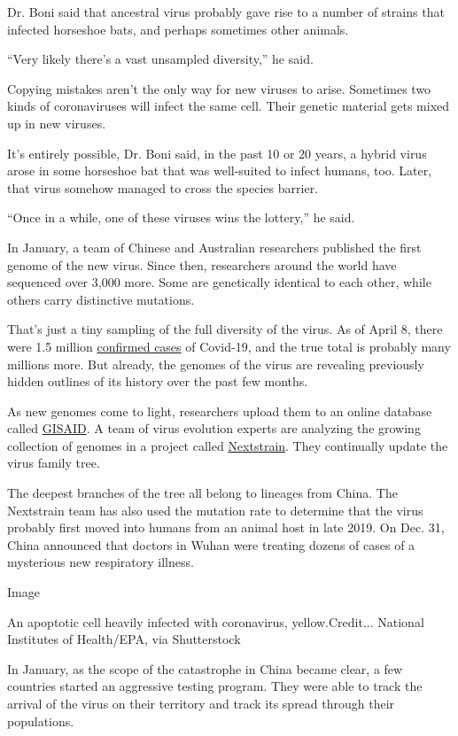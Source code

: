 Dr. Boni said that ancestral virus probably gave rise to a number of
strains that infected horseshoe bats, and perhaps sometimes other
animals.

``Very likely there's a vast unsampled diversity,'' he said.

Copying mistakes aren't the only way for new viruses to arise. Sometimes
two kinds of coronaviruses will infect the same cell. Their genetic
material gets mixed up in new viruses.

It's entirely possible, Dr. Boni said, in the past 10 or 20 years, a
hybrid virus arose in some horseshoe bat that was well-suited to infect
humans, too. Later, that virus somehow managed to cross the species
barrier.

``Once in a while, one of these viruses wins the lottery,'' he said.

In January, a team of Chinese and Australian researchers published the
first genome of the new virus. Since then, researchers around the world
have sequenced over 3,000 more. Some are genetically identical to each
other, while others carry distinctive mutations.

That's just a tiny sampling of the full diversity of the virus. As of
April 8, there were 1.5 million
\href{https://gisanddata.maps.arcgis.com/apps/opsdashboard/index.html\#/bda7594740fd40299423467b48e9ecf6}{confirmed
cases} of Covid-19, and the true total is probably many millions more.
But already, the genomes of the virus are revealing previously hidden
outlines of its history over the past few months.

As new genomes come to light, researchers upload them to an online
database called \href{https://www.gisaid.org/}{GISAID}. A team of virus
evolution experts are analyzing the growing collection of genomes in a
project called \href{https://nextstrain.org/}{Nextstrain}. They
continually update the virus family tree.

The deepest branches of the tree all belong to lineages from China. The
Nextstrain team has also used the mutation rate to determine that the
virus probably first moved into humans from an animal host in late 2019.
On Dec. 31, China announced that doctors in Wuhan were treating dozens
of cases of a mysterious new respiratory illness.

Image

An apoptotic cell heavily infected with coronavirus, yellow.Credit...
National Institutes of Health/EPA, via Shutterstock

In January, as the scope of the catastrophe in China became clear, a few
countries started an aggressive testing program. They were able to track
the arrival of the virus on their territory and track its spread through
their populations.

